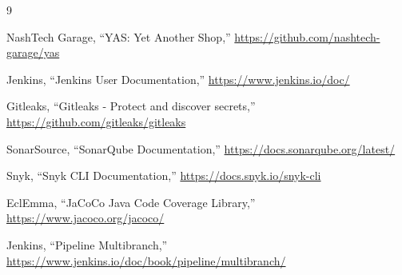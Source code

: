 \cleardoublepage
{}
{}

\begin{thebibliography}{9}

NashTech Garage, ``YAS: Yet Another Shop,''
\url{https://github.com/nashtech-garage/yas}

Jenkins, ``Jenkins User Documentation,''
\url{https://www.jenkins.io/doc/}

Gitleaks, ``Gitleaks - Protect and discover secrets,''
\url{https://github.com/gitleaks/gitleaks}

SonarSource, ``SonarQube Documentation,''
\url{https://docs.sonarqube.org/latest/}

Snyk, ``Snyk CLI Documentation,''
\url{https://docs.snyk.io/snyk-cli}

EclEmma, ``JaCoCo Java Code Coverage Library,''
\url{https://www.jacoco.org/jacoco/}

Jenkins, ``Pipeline Multibranch,''
\url{https://www.jenkins.io/doc/book/pipeline/multibranch/}

\end{thebibliography}